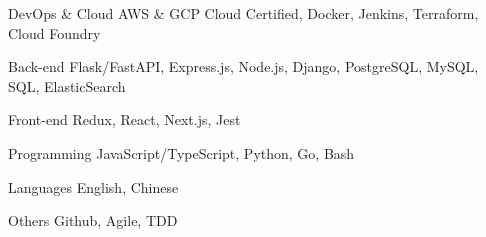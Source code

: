 

\begin{cvskills}

  \cvskill
    {DevOps \& Cloud} %
    {AWS \& GCP Cloud Certified, Docker, Jenkins, Terraform, Cloud Foundry} %

  \cvskill
    {Back-end} %
    {Flask/FastAPI, Express.js, Node.js, Django, PostgreSQL, MySQL, SQL, ElasticSearch} %

  \cvskill
    {Front-end} %
    {Redux, React, Next.js, Jest} %

  \cvskill
    {Programming} %
    {JavaScript/TypeScript, Python, Go, Bash} %

  \cvskill
    {Languages} %
    {English, Chinese} %

  \cvskill
    {Others} %
    {Github, Agile, TDD} %


\end{cvskills}
